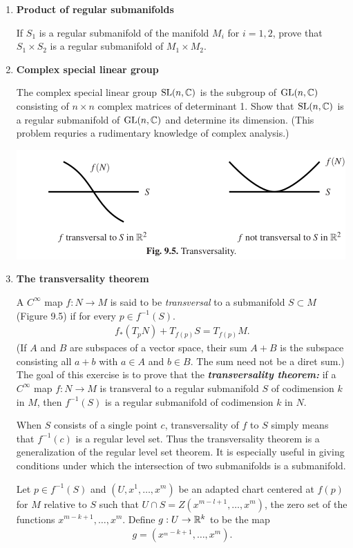 \documentclass[12pt,a4paper]{report}
\begin{document}
\begin{enumerate}[label=9.\arabic*.]
\item \textbf{Product of regular submanifolds}

If $S_1$ is a regular submanifold of the manifold $M_i$ for $i=1,2$, prove that $S_1 \times S_2$ is a regular submanifold of $M_1 \times M_2$.

\item \textbf{Complex special linear group}
\newcommand{\SL}{\operatorname{SL}}
\newcommand{\GL}{\operatorname{GL}}

The complex special linear group $\SL(n,\C)$ is the subgroup of $\GL(n,\C)$ consisting of $n\times n$ complex matrices of determinant 1.  Show that $\SL(n, \C)$ is a regular submanifold of $\GL(n,\C)$ and determine its dimension. (This problem requries a rudimentary knowledge of complex analysis.)

\includegraphics[scale=1]{Tu_9.5.png} 
\item \textbf{The transversality theorem}

A $C^\infty$ map $f: N \to M$ is said to be \textit{transversal} to a submanifold $S \subset M$ (Figure 9.5) if for every $p\in f^{-1}(S)$.
\begin{align*}
	f_*(T_pN)+T_{f(p)}S=T_{f(p)}M.
\end{align*}(If $A$ and $B$ are subspaces of a vector space, their sum $A+B$ is the subspace consisting all $a+b$ with $a \in A$ and $b \in B$.  The sum need not be a diret sum.)  The goal of this exercise is to prove that the \textit{\textbf{transversality theorem:}} if a $C^\infty$ map $f:N \to M$ is transveral to a regular submanifold $S$ of codimension $k$ in $M$, then $f^{-1}(S)$ is a regular submanifold of codimension $k$ in $N$.

When $S$ consists of a single point $c$, transversality of $f$ to $S$ simply means that $f^{-1}(c)$ is a regular level set.  Thus the transversality theorem is a generalization of the regular level set theorem.  It is especially useful in giving conditions under which the intersection of two submanifolds is a submanifold.

Let $p \in f^{-1}(S)$ and $(U,x^1,\dots,x^m)$ be an adapted chart centered at $f(p)$ for $M$ relative to $S$ such that $U\cap S=Z(x^{m-l+1}, \dots, x^m)$, the zero set of the functions $x^{m-k+1},\dots,x^m$.  Define $g:U \to \mathbb{R}^k$ to be the map
\begin{align*}
	g = (x^{_m-k+1},\dots,x^m).
\end{align*}


\end{enumerate}
\end{document}

